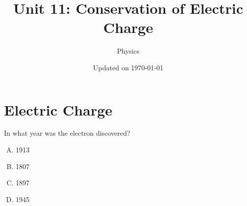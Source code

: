 \documentclass[14pt,t,dvipsnames]{beamer}
\title{Unit 11: Conservation of Electric Charge}
\subtitle{Physics}
\author{}
\date{Updated on \today}
\begin{document}
\begin{frame}
\titlepage
\end{frame}








\section{Electric Charge}


\begin{frame}
In what year was the electron discovered?


\begin{enumerate}[A.]
    \item 1913
    \item 1807
    \item \alert<2->{1897}
    \item 1945
\end{enumerate}
\end{frame}



\end{document}
